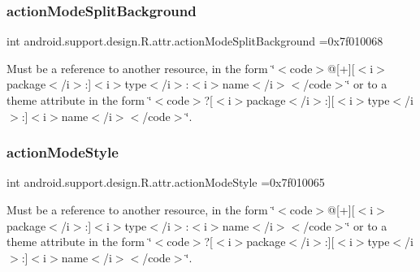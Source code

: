 \subsubsection{\texorpdfstring{action\+Mode\+Split\+Background}{actionModeSplitBackground}}
{\footnotesize\ttfamily int android.\+support.\+design.\+R.\+attr.\+action\+Mode\+Split\+Background =0x7f010068\hspace{0.3cm}{\ttfamily [static]}}

Must be a reference to another resource, in the form \char`\"{}$<$code$>$@\mbox{[}+\mbox{]}\mbox{[}$<$i$>$package$<$/i$>$\+:\mbox{]}$<$i$>$type$<$/i$>$\+:$<$i$>$name$<$/i$>$$<$/code$>$\char`\"{} or to a theme attribute in the form \char`\"{}$<$code$>$?\mbox{[}$<$i$>$package$<$/i$>$\+:\mbox{]}\mbox{[}$<$i$>$type$<$/i$>$\+:\mbox{]}$<$i$>$name$<$/i$>$$<$/code$>$\char`\"{}. \mbox{\label{classandroid_1_1support_1_1design_1_1R_1_1attr_a586b72ccbb967f2df3c504d4bb611a90}} 
\subsubsection{\texorpdfstring{action\+Mode\+Style}{actionModeStyle}}
{\footnotesize\ttfamily int android.\+support.\+design.\+R.\+attr.\+action\+Mode\+Style =0x7f010065\hspace{0.3cm}{\ttfamily [static]}}

Must be a reference to another resource, in the form \char`\"{}$<$code$>$@\mbox{[}+\mbox{]}\mbox{[}$<$i$>$package$<$/i$>$\+:\mbox{]}$<$i$>$type$<$/i$>$\+:$<$i$>$name$<$/i$>$$<$/code$>$\char`\"{} or to a theme attribute in the form \char`\"{}$<$code$>$?\mbox{[}$<$i$>$package$<$/i$>$\+:\mbox{]}\mbox{[}$<$i$>$type$<$/i$>$\+:\mbox{]}$<$i$>$name$<$/i$>$$<$/code$>$\char`\"{}. \mbox{\label{classandroid_1_1support_1_1design_1_1R_1_1attr_a06691df3ec2afae16de6a1473fa93551}} 
